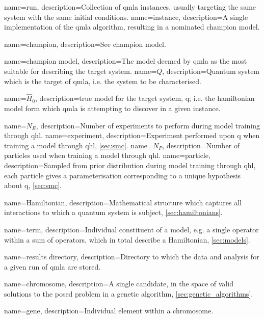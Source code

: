 {
    name=run,
    description={Collection of \acrshort{qmla} \glspl{instance}, usually targeting the same system with the same initial conditions.}
}
{
    name=instance,
    description={A single implementation of the \acrshort{qmla} algorithm, resulting in a nominated \gls{champion model}.}
}

{
    name=champion,
    description={See \gls{champion model}.}
}

{
    name=champion model,
    description={The model deemed by \acrshort{qmla} as the most suitable for describing the target system.}
}
{
    name=$Q$,
    description={Quantum system which is the target of \acrshort{qmla}, i.e. the system to be characterised.}
}

{
    name=$\hat{H}_0$,
    description={\Gls{true model} for the target system, \gls{q}; 
        i.e. the \gls{hamiltonian} \gls{model} form which \acrshort{qmla} is attempting to discover in a given \gls{instance}.
    }
}

{
    name=$N_E$,
    description={Number of \glspl{experiment} to perform during model training through \acrshort{qhl}.}
}
{
    name=experiment,
    description={Experiment performed upon \gls{q} when training a model through \acrshort{qhl}, \cref{sec:smc}.}
}
{
    name=$N_P$,
    description={Number of \glspl{particle} used when training a \gls{model} through \acrshort{qhl}.}
}
{
    name=particle,
    description={Sampled from prior distribution during model training through \acrshort{qhl}, each particle gives a parameterisation corresponding to a unique 
    hypothesis about \gls{q}, \cref{sec:smc}.
    }
}

{
    name=Hamiltonian,
    description={Mathematical structure which captures all interactions to which a quantum system is subject, \cref{sec:hamiltonians}.}
}


{
    name=term,
    description={Individual constituent of a model, 
    e.g. a single operator within a sum of operators, which in total describe a Hamiltonian, \cref{sec:models}.
    }
}

{
    name={results directory},
    description={Directory to which the data and analysis for a given \gls{run} of \acrshort{qmla} are stored.
    }
}

{
    name=chromosome,
    description={A single candidate, in the space of valid solutions to the posed problem in a genetic algorithm, \cref{sec:genetic_algorithms}.
    }
}

{
    name=gene,
    description={Individual element within a \gls{chromosome}.
    }
}


\RestoreAcronyms
\makeglossaries
\preto\chapter{\glsresetall}
